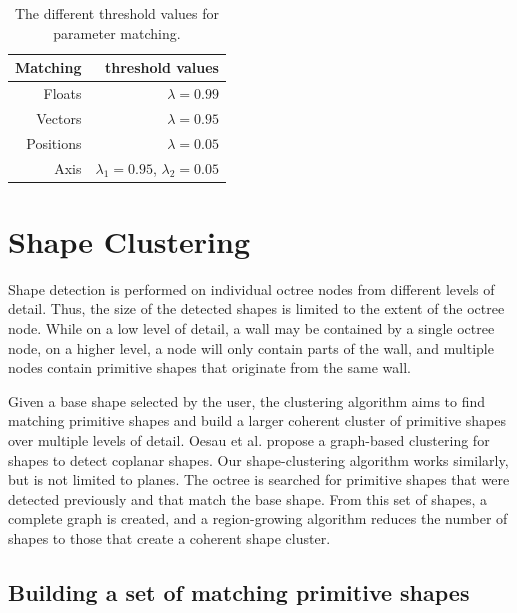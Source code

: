 \begin{table}
\centering
\begin{tabular}{ r | r }
    Matching  & threshold values \\
  \hline
  Floats    & $\lambda = 0.99$ \\
  Vectors     & $\lambda = 0.95$ \\
  Positions    & $\lambda = 0.05$ \\ 
  Axis        & $\lambda_1 = 0.95$, $\lambda_2 = 0.05$\\  

\end{tabular}
\caption[Different threshold values for parameter matching]
{The different threshold values for parameter matching.}
\label{tab:matchingThresholds}
\end{table}


\section{Shape Clustering}
\label{sec:shapeClustering}


Shape detection is performed on individual octree nodes from different levels of detail. Thus, the size of the detected shapes is limited to the extent of the octree node. While on a low level of detail, a wall may be contained by a single octree node, on a higher level, a node will only contain parts of the wall, and multiple nodes contain primitive shapes that originate from the same wall. 

\par

Given a base shape selected by the user, the clustering algorithm aims to find matching primitive shapes and build a larger coherent cluster of primitive shapes over multiple levels of detail. Oesau et al. \cite{oesau2016planar} propose a graph-based clustering for shapes to detect coplanar shapes. Our shape-clustering algorithm works similarly, but is not limited to planes. The octree is searched for primitive shapes that were detected previously and that match the base shape. From this set of shapes, a complete graph is created, and a region-growing algorithm reduces the number of shapes to those that create a coherent shape cluster. 


\subsection{Building a set of matching primitive shapes}
\label{sec:matchingSetBuilding}

